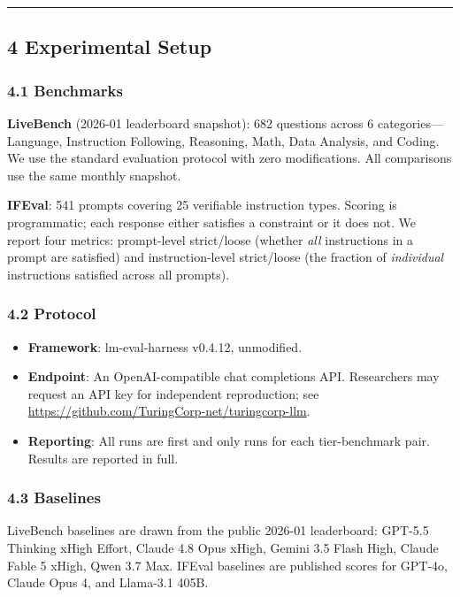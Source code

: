 \documentclass[
]{article}
\providecommand{\tightlist}{%
  \setlength{\itemsep}{0pt}\setlength{\parskip}{0pt}}
\begin{document}
\begin{center}\rule{0.5\linewidth}{0.5pt}\end{center}

\subsection{4 Experimental Setup}\label{experimental-setup}

\subsubsection{4.1 Benchmarks}\label{benchmarks}

\textbf{LiveBench} (2026-01 leaderboard snapshot): 682 questions across 6 categories---Language, Instruction Following, Reasoning, Math, Data Analysis, and Coding. We use the standard evaluation protocol with zero modifications. All comparisons use the same monthly snapshot.

\textbf{IFEval}: 541 prompts covering 25 verifiable instruction types. Scoring is programmatic; each response either satisfies a constraint or it does not. We report four metrics: prompt-level strict/loose (whether \textit{all} instructions in a prompt are satisfied) and instruction-level strict/loose (the fraction of \textit{individual} instructions satisfied across all prompts).

\subsubsection{4.2 Protocol}\label{protocol}

\begin{itemize}
\tightlist
\item \textbf{Framework}: lm-eval-harness v0.4.12, unmodified.
\item \textbf{Endpoint}: An OpenAI-compatible chat completions API. Researchers may request an API key for independent reproduction; see \url{https://github.com/TuringCorp-net/turingcorp-llm}.
\item \textbf{Reporting}: All runs are first and only runs for each tier-benchmark pair. Results are reported in full.
\end{itemize}

\subsubsection{4.3 Baselines}\label{baselines}

LiveBench baselines are drawn from the public 2026-01 leaderboard: GPT-5.5 Thinking xHigh Effort, Claude 4.8 Opus xHigh, Gemini 3.5 Flash High, Claude Fable 5 xHigh, Qwen 3.7 Max. IFEval baselines are published scores for GPT-4o, Claude Opus 4, and Llama-3.1 405B.
\end{document}
